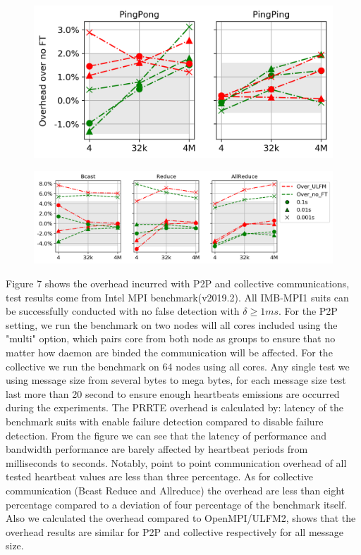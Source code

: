 \documentclass[sigconf]{acmart}
\begin{document}
\begin{figure}[h]
\centering
\begin{minipage}{.38\textwidth}
  \centering
  \includegraphics[width=\linewidth]{multi_pingping_pingpong_overhead.png}
  \label{fig:Ring}
\end{minipage}%
\begin{minipage}{.62\textwidth}
  \centering
  \includegraphics[width=\linewidth]{Bcast_overhead_with_ulfm_max_col.png}
  \label{fig:Reconnect Ring}
\end{minipage}
\end{figure}

Figure 7 shows the overhead incurred with P2P and collective communications, test results come from Intel MPI benchmark(v2019.2). All IMB-MPI1 suits can be successfully conducted with no false detection with $ \delta \geq 1 ms $. For the P2P setting, we run the benchmark on two nodes will all cores included using the "multi" option, which pairs core from both node as groups to ensure that no matter how daemon are binded the communication will be affected. For the collective we run the benchmark on 64 nodes using all cores. Any single test we using message size from several bytes to mega bytes, for each message size test last more than 20 second to ensure enough heartbeats emissions are occurred during the experiments. The PRRTE overhead is calculated by: latency of the benchmark suits with enable failure detection compared to disable failure detection. From the figure we can see that the latency of performance and bandwidth performance are barely affected by heartbeat periods from milliseconds to seconds. Notably, point to point communication overhead of all tested heartbeat values are less than three percentage. As for collective communication (Bcast Reduce and Allreduce) the overhead are less than eight percentage compared to a deviation of four percentage of the benchmark itself. Also we calculated the overhead compared to OpenMPI/ULFM2, shows that the overhead results are similar for P2P and collective respectively for all message size.
\end{document}
